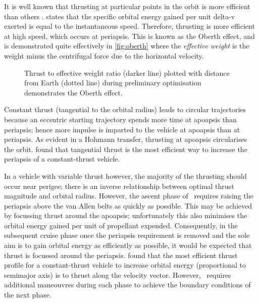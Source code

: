 It is well known that thrusting at particular points in the orbit is more efficient than others \parencite{Kemble2006}. \textcite{Oberth1923} states that the specific orbital energy gained per unit delta-v exerted is equal to the instantaneous speed. Therefore, thrusting is more efficient at high speed, which occurs at periapsis. This is known as the Oberth effect, and is demonstrated quite effectively in \autoref{fig:oberth} where the \emph{effective weight} is the weight minus the centrifugal force due to the horizontal velocity.

\begin{figure}
\centering
\def\svgwidth{\figurewidth}

\caption{Thrust to effective weight ratio (darker line) plotted with distance from Earth (dotted line) during preliminary optimisation demonstrates the Oberth effect.} \label{fig:oberth}
\end{figure}

Constant thrust (tangential to the orbital radius) leads to circular trajectories because an eccentric starting trajectory spends more time at apoapsis than periapsis; hence more impulse is imparted to the vehicle at apoapsis than at periapsis. As evident in a Hohmann transfer, thrusting at apoapsis circularises the orbit. \textcite{Racca9} found that tangential thrust is the most efficient way to increase the periapsis of a constant-thrust vehicle.

In a vehicle with variable thrust however, the majority of the thrusting should occur near perigee; there is an inverse relationship between optimal thrust magnitude and orbital radius. However, the ascent phase of \BW\ requires raising the periapsis above the van Allen belts as quickly as possible. This may be achieved by focussing thrust around the apoapsis; unfortunately this also minimises the orbital energy gained per unit of propellant expended. Consequently, in the subsequent cruise phase once the periapsis requirement is removed and the sole aim is to gain orbital energy as efficiently as possible, it would be expected that thrust is focussed around the periapsis. \textcite{Racca9} found that the most efficient thrust profile for a constant-thrust vehicle to increase orbital energy (proportional to semimajor axis) is to thrust along the velocity vector. However, \BW\ requires additional maneouvres during each phase to achieve the boundary conditions of the next phase. 

